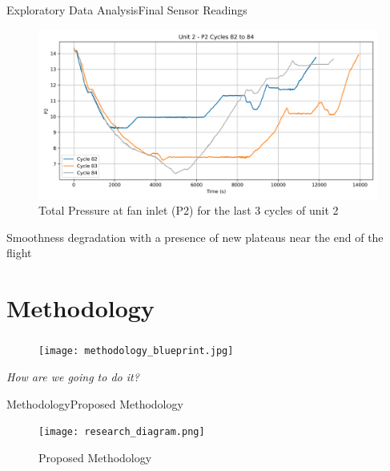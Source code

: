 \documentclass{beamer}
\begin{document}
        \begin{frame}{Exploratory Data Analysis}{Final Sensor Readings}
            \begin{figure}[!htbp]
                \centering
                \includegraphics[scale=0.35]{unit_2_P2_cycles_82_84.png}
                \caption{Total Pressure at fan inlet (P2) for the last 3 cycles of unit 2}
            \end{figure}
            Smoothness degradation with a presence of new plateaus near the end of the flight
        \end{frame}

    \section{Methodology}

        {
            \begin{frame}
                \frametitle{\insertsection}
                \begin{figure}
                    \centering
                    \texttt{[image: methodology\_blueprint.jpg]}
                \end{figure}
                \begin{center}
                    \textit{How are we going to do it?}
                \end{center}
            \end{frame}
        }

        \begin{frame}{Methodology}{Proposed Methodology}
            \begin{figure}[!htbp]
                \centering
                \texttt{[image: research\_diagram.png]}
                \caption{Proposed Methodology}
            \end{figure}
        \end{frame}
\end{document}
